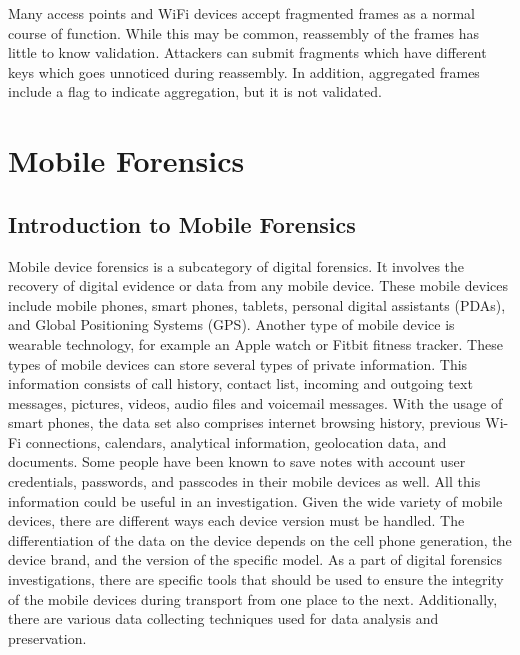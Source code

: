 \documentclass[acmlarge]{style/acmart}
\begin{document}
Many access points and WiFi devices accept fragmented frames as a normal course of function. While this may be common, reassembly of the frames has little to know validation. Attackers can submit fragments which have different keys which goes unnoticed during reassembly. In addition, aggregated frames include a flag to indicate aggregation, but it is not validated.



\section{Mobile Forensics}
\subsection{Introduction to Mobile Forensics}
Mobile device forensics is a subcategory of digital forensics.  It involves the recovery of digital evidence or data from any mobile device.  These mobile devices include mobile phones, smart phones, tablets, personal digital assistants (PDAs), and Global Positioning Systems (GPS).  Another type of mobile device is wearable technology, for example an Apple watch or Fitbit fitness tracker.  These types of mobile devices can store several types of private information.  This information consists of call history, contact list, incoming and outgoing text messages, pictures, videos, audio files and voicemail messages. With the usage of smart phones, the data set also comprises internet browsing history, previous Wi-Fi connections, calendars, analytical information, geolocation data, and documents.  Some people have been known to save notes with account user credentials, passwords, and passcodes in their mobile devices as well.  All this information could be useful in an investigation.  Given the wide variety of mobile devices, there are different ways each device version must be handled.  The differentiation of the data on the device depends on the cell phone generation, the device brand, and the version of the specific model.  As a part of digital forensics investigations, there are specific tools that should be used to ensure the integrity of the mobile devices during transport from one place to the next.  Additionally, there are various data collecting techniques used for data analysis and preservation.
\end{document}
